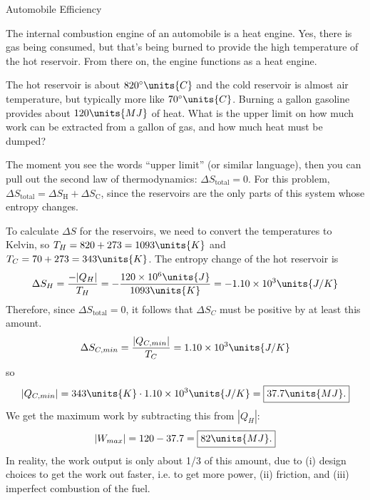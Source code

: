 \begin{example}{Automobile Efficiency}

\label{example:automobile_efficiency}

The internal combustion engine of an automobile is a heat engine.
Yes, there is gas being consumed, but that's being burned to provide
the high temperature of the hot reservoir.  From there on, the engine
functions as a heat engine.  

The hot reservoir is about $820^\circ\units{C}$ and the cold reservoir
is almost air temperature, but typically more like
$70^\circ\units{C}$.  Burning a gallon gasoline provides about
$120\units{MJ}$ of heat.  What is the upper limit on how much work can
be extracted from a gallon of gas, and how much heat must be dumped?

\solution The moment you see the words ``upper limit'' (or similar
language), then you can pull out the second law of thermodynamics:
$\Delta S_\text{total} = 0$.  For this problem, $\Delta S_\text{total}
= \Delta S_\text{H} + \Delta S_\text{C}$, since the reservoirs are the
only parts of this system whose entropy changes.

To calculate $\Delta S$ for the reservoirs, we need to convert the
temperatures to Kelvin, so $T_H=820+273=1093\units{K}$ and
$T_C=70+273=343\units{K}$.  The entropy change of the hot reservoir is
\begin{equation}
\Delta S_H = \frac{-|Q_H|}{T_H} = 
-\frac{120\times 10^6\units{J}}{1093\units{K}}
 = -1.10\times 10^{3}\units{J/K}
\end{equation}
Therefore, since $\Delta S_\text{total} = 0$, it follows that  
$\Delta S_C$ must be positive by at least this amount.
\begin{equation}
\Delta S_{C,min} = \frac{|Q_{C,min}|}{T_C} = 1.10\times
10^3\units{J/K}
\end{equation}
so
\begin{equation}
|Q_{C,min}| = 343\units{K} \cdot 1.10\times 10^{3}\units{J/K}=
\boxed{37.7\units{MJ}.}
\end{equation}
We get the maximum work by subtracting this from $|Q_H|$:
\begin{equation}
|W_{max}| = 120 - 37.7 = \boxed{82\units{MJ}.}
\end{equation}
In reality, the work output is only about 1/3 of this amount, due to
(i) design choices to get the work out faster, i.e. to get more power,
(ii) friction, and (iii) imperfect combustion of the fuel.
\end{example}

